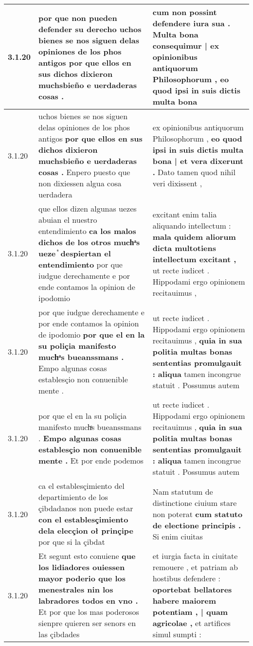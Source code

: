 \begin{tabular}{|p{1cm}|p{6.5cm}|p{6.5cm}|}
3.1.20 & por que non pueden defender su derecho \textbf{ uchos bienes se nos siguen delas opiniones de los phos antigos } por que ellos en sus dichos dixieron muchsbieño e uerdaderas cosas . & cum non possint defendere iura sua . \textbf{ Multa bona consequimur | ex opinionibus antiquorum Philosophorum , } eo quod ipsi in suis dictis multa bona \\\hline
3.1.20 & uchos bienes se nos siguen delas opiniones de los phos antigos \textbf{ por que ellos en sus dichos dixieron muchsbieño e uerdaderas cosas . } Enpero puesto que non dixiessen algua cosa uerdadera & ex opinionibus antiquorum Philosophorum , \textbf{ eo quod ipsi in suis dictis multa bona | et vera dixerunt . } Dato tamen quod nihil veri dixissent , \\\hline
3.1.20 & que ellos dizen algunas uezes abuian el nuestro entendimiento \textbf{ ca los malos dichos de los otros muchͣs ueze ᷤ despiertan el entendimiento } por que iudgue derechamente e por ende contamos la opinion de ipodomio & excitant enim talia aliquando intellectum : \textbf{ mala quidem aliorum dicta multotiens intellectum excitant , } ut recte iudicet . Hippodami ergo opinionem recitauimus , \\\hline
3.1.20 & por que iudgue derechamente e por ende contamos la opinion de ipodomio \textbf{ por que el en la su poliçia manifesto muchͣs bueanssmans . } Empo algunas cosas establesçio non conuenible mente . & ut recte iudicet . Hippodami ergo opinionem recitauimus , \textbf{ quia in sua politia multas bonas sententias promulgauit : aliqua } tamen incongrue statuit . Possumus autem \\\hline
3.1.20 & por que el en la su poliçia manifesto muchͣs bueanssmans . \textbf{ Empo algunas cosas establesçio non conuenible mente . } Et por ende podemos & ut recte iudicet . Hippodami ergo opinionem recitauimus , \textbf{ quia in sua politia multas bonas sententias promulgauit : aliqua } tamen incongrue statuit . Possumus autem \\\hline
3.1.20 & ca el establesçimiento del departimiento de los çibdadanos non puede estar \textbf{ con el establesçimiento dela elecçion oł prinçipe } por que si la çibdat & Nam statutum de distinctione ciuium stare non poterat \textbf{ cum statuto de electione principis . } Si enim ciuitas \\\hline
3.1.20 & Et segunt esto conuiene \textbf{ que los lidiadores ouiessen mayor poderio que los menestrales nin los labradores todos en vno . } Et por que los mas poderosos sienpre quieren ser senors en las çibdades & et iurgia facta in ciuitate remouere , et patriam ab hostibus defendere : \textbf{ oportebat bellatores habere maiorem potentiam , | quam agricolae , } et artifices simul sumpti : \\\hline

\end{tabular}
